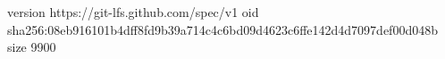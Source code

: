 version https://git-lfs.github.com/spec/v1
oid sha256:08eb916101b4dff8fd9b39a714c4c6bd09d4623c6ffe142d4d7097def00d048b
size 9900

